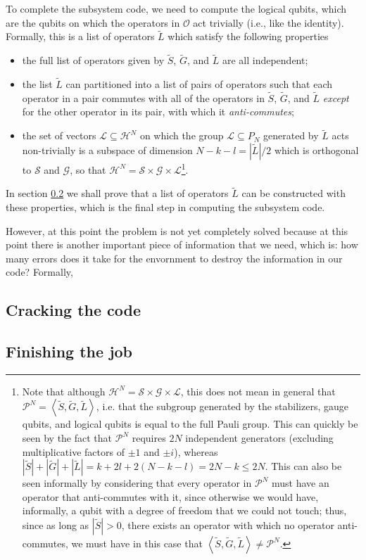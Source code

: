 \documentclass[twocolumn,showpacs,preprintnumbers,amsmath,amssymb,nofootinbib,pra,floatfix]{revtex4}
\begin{document}
To complete the subsystem code, we need to compute the logical qubits, which are the qubits on which the operators in $\mathcal{O}$ act trivially (i.e., like the identity).  Formally, this is a list of operators $\tilde L$ which satisfy the following properties
\begin{itemize}
\item the full list of operators given by $\tilde S$, $\tilde G$, and $\tilde L$ are all independent;
\item the list $\tilde L$ can partitioned into a list of pairs of operators such that each operator in a pair commutes with all of the operators in $\tilde S$, $\tilde G$, and $\tilde L$ \emph{except} for the other operator in its pair, with which it \emph{anti-commutes};
\item the set of vectors $\mathscr{L}\subseteq \mathscr{H}^N$ on which the group $\mathcal{L}\subseteq P_N$ generated by $\tilde L$ acts non-trivially is a subspace of dimension $N-k-l=|\tilde L|/2$ which is orthogonal to $\mathscr{S}$ and $\mathscr{G}$, so that $\mathscr{H}^N=\mathscr{S}\times\mathscr{G}\times\mathscr{L}$\footnote{Note that although $\mathscr{H}^N=\mathscr{S}\times\mathscr{G}\times\mathscr{L}$, this does not mean in general that $\mathcal{P}^N=\left<\tilde S,\tilde G,\tilde L\right>$, i.e. that the subgroup generated by the stabilizers, gauge qubits, and logical qubits is equal to the full Pauli group.  This can quickly be seen by the fact that $\mathcal{P}^N$ requires $2N$ independent generators (excluding multiplicative factors of $\pm 1$ and $\pm i$), whereas $|\tilde S|+|\tilde G|+|\tilde L|=k+2l+2(N-k-l)=2N-k\le 2N$.  This can also be seen informally by considering that every operator in $\mathcal{P}^N$ must have an operator that anti-commutes with it, since otherwise we would have, informally, a qubit with a degree of freedom that we could not touch; thus, since as long as $|\tilde S|>0$, there exists an operator with which no operator anti-commutes, we must have in this case that $\left<\tilde S,\tilde G,\tilde L\right>\ne \mathcal{P}^N$.}.
\end{itemize}
In section \ref{finishing-the-job} we shall prove that a list of operators $\tilde L$ can be constructed with these properties, which is the final step in computing the subsystem code.

However, at this point the problem is not yet completely solved because at this point there is another important piece of information that we need, which is:  how many errors does it take for the envornment to destroy the information in our code?  Formally, 
\subsection{Cracking the code}

\label{cracking-the-code}
\subsection{Finishing the job}
\label{finishing-the-job}
\end{document}
